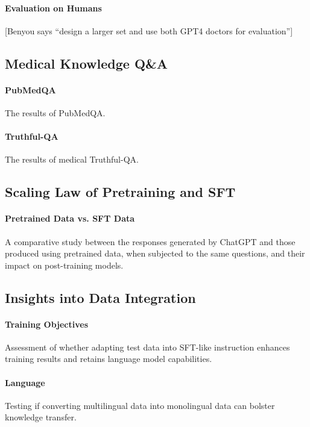 \documentclass{article} %
\newcommand{\benyou}[1]{{ \color{blue} [Benyou says ``#1'']}}
\begin{document}
    \paragraph{Evaluation on Humans} 


    \benyou{design a larger set and use both GPT4 doctors for evaluation}

\subsection{Medical Knowledge Q\&A}
    \paragraph{PubMedQA}
    The results of PubMedQA.
    
    \paragraph{Truthful-QA}
    The results of medical Truthful-QA.

\subsection{Scaling Law of Pretraining and SFT}
    \paragraph{Pretrained Data vs. SFT Data}
    A comparative study between the responses generated by ChatGPT and those produced using pretrained data, when subjected to the same questions, and their impact on post-training models.

\subsection{Insights into Data Integration}
    \paragraph{Training Objectives}
    Assessment of whether adapting test data into SFT-like instruction enhances training results and retains language model capabilities.
    
    \paragraph{Language}
    Testing if converting multilingual data into monolingual data can bolster knowledge transfer.
    
\end{document}

